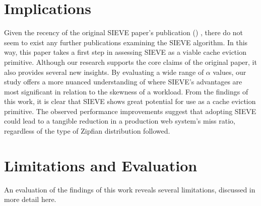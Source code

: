 
\section{Implications}\label{discussion:implications}


Given the recency of the original SIEVE paper's publication (\citeyear{sieve}) \cite{sieve}, there do not seem to exist any further publications examining the SIEVE algorithm. In this way, this paper takes a first step in assessing SIEVE as a viable cache eviction primitive. Although our research supports the core claims of the original paper, it also provides several new insights. By evaluating a wide range of $\alpha$ values, our study offers a more nuanced understanding of where SIEVE's advantages are most significant in relation to the skewness of a workload. From the findings of this work, it is clear that SIEVE shows great potential for use as a cache eviction primitive. The observed performance improvements suggest that adopting SIEVE could lead to a tangible reduction in a production web system's miss ratio, regardless of the type of Zipfian distribution followed. 

\section{Limitations and Evaluation}\label{discussion:limitations}


An evaluation of the findings of this work reveals several limitations, discussed in more detail here.

